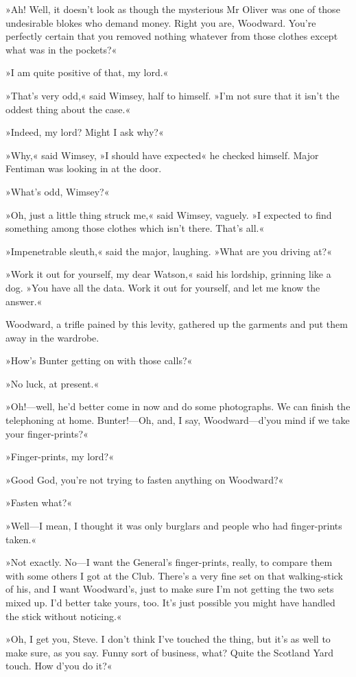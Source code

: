 »Ah! Well, it doesn't look as though the mysterious Mr Oliver was one of those undesirable blokes who demand money. Right you are, Woodward. You're perfectly certain that you removed nothing whatever from those clothes except what was in the pockets?«

»I am quite positive of that, my lord.«

»That's very odd,« said Wimsey, half to himself. »I'm not sure that it isn't the oddest thing about the case.«

»Indeed, my lord? Might I ask why?«

»Why,« said Wimsey, »I should have expected\longdash« he checked himself. Major Fentiman was looking in at the door.

»What's odd, Wimsey?«

»Oh, just a little thing struck me,« said Wimsey, vaguely. »I expected to find something among those clothes which isn't there. That's all.«

»Impenetrable sleuth,« said the major, laughing. »What are you driving at?«

»Work it out for yourself, my dear Watson,« said his lordship, grinning like a dog. »You have all the data. Work it out for yourself, and let me know the answer.«

Woodward, a trifle pained by this levity, gathered up the garments and put them away in the wardrobe.

»How's Bunter getting on with those calls?«

»No luck, at present.«

»Oh!—well, he'd better come in now and do some photographs. We can finish the telephoning at home. Bunter!—Oh, and, I say, Woodward—d'you mind if we take your finger-prints?«

»Finger-prints, my lord?«

»Good God, you're not trying to fasten anything on Woodward?«

»Fasten what?«

»Well—I mean, I thought it was only burglars and people who had finger-prints taken.«

»Not exactly. No—I want the General's finger-prints, really, to compare them with some others I got at the Club. There's a very fine set on that walking-stick of his, and I want Woodward's, just to make sure I'm not getting the two sets mixed up. I'd better take yours, too. It's just possible you might have handled the stick without noticing.«

»Oh, I get you, Steve. I don't think I've touched the thing, but it's as well to make sure, as you say. Funny sort of business, what? Quite the Scotland Yard touch. How d'you do it?«


